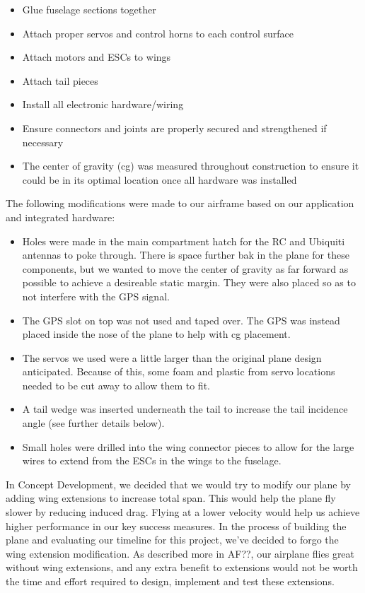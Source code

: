 \documentclass[]{auvsi_doc}
\begin{document}
\begin{itemize}
	\item Glue fuselage sections together
	\item Attach proper servos and control horns to each control surface
	\item Attach motors and ESCs to wings
	\item Attach tail pieces
	\item Install all electronic hardware/wiring
	\item Ensure connectors and joints are properly secured and strengthened if necessary
	\item The center of gravity (cg) was measured throughout construction to ensure it could be in its optimal location once all hardware was installed 
\end{itemize}

The following modifications were made to our airframe based on our application and integrated hardware:

\begin{itemize}
	\item Holes were made in the main compartment hatch for the RC and Ubiquiti antennas to poke through. There is space further bak in the plane for these components, but we wanted to move the center of gravity as far forward as possible to achieve a desireable static margin. They were also placed so as to not interfere with the GPS signal.
	\item The GPS slot on top was not used and taped over. The GPS was instead placed inside the nose of the plane to help with cg placement.
	\item The servos we used were a little larger than the original plane design anticipated. Because of this, some foam and plastic from servo locations needed to be cut away to allow them to fit.
	\item A tail wedge was inserted underneath the tail to increase the tail incidence angle (see further details below).
	\item Small holes were drilled into the wing connector pieces to allow for the large wires to extend from the ESCs in the wings to the fuselage.
\end{itemize}

In Concept Development, we decided that we would try to modify our plane by adding wing extensions to increase total span. This would help the plane fly slower by reducing induced drag. Flying at a lower velocity would help us achieve higher performance in our key success measures. In the process of building the plane and evaluating our timeline for this project, we've decided to forgo the wing extension modification. As described more in AF??, our airplane flies great without wing extensions, and any extra benefit to extensions would not be worth the time and effort required to design, implement and test these extensions.
\end{document}
